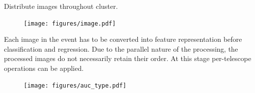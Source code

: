 \begin{multicols}{2}
\begin{center}
        \begin{streamblock}[colframe=white!60!black, height=2.1cm, width=0.8\linewidth]{-5mm}{0mm}{}%
          \begin{center}
            Distribute images throughout cluster.
          \end{center}
        \end{streamblock}%

        \begin{streamblock}[equal height group=C, width=0.8\linewidth]{0mm}{-5mm}{}%
          \begin{multicols}{2}
            \begin{figure}
              \texttt{[image: figures/image.pdf]}
            \end{figure}

            \columnbreak
            Each image in the event has to be converted into feature representation before classification and regression.
            Due to the parallel nature of the processing, the processed images do not necessarily retain their order.
            At this stage per-telescope operations can be applied.

          \end{multicols}
        \end{streamblock}%

        \begin{streamblock}[equal height group=C, width=0.8\linewidth]{-5mm}{-5mm}{}%
          \begin{multicols}{2}
            \begin{figure}
              \texttt{[image: figures/auc\_type.pdf]}
            \end{figure}
            \columnbreak


\end{multicols}
\end{streamblock}
\end{center}
\end{multicols}
